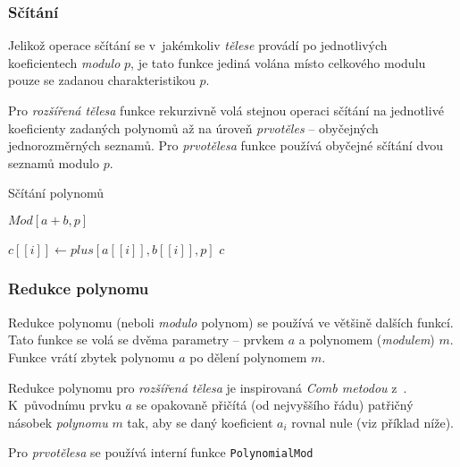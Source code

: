 \documentclass[thesis=M,czech,hidelinks]{FITthesis}[2012/06/26]
\newcommand{\0}{{\textcolor[gray]{0.100}{0}}}
\newenvironment{algoritmus}{
    \floatname{algorithm}{Algoritmus}
    \begin{algorithm}
}{\end{algorithm}}
\begin{document}
\subsubsection{Sčítání}
Jelikož operace sčítání se v~jakémkoliv \emph{tělese} provádí po jednotlivých
koeficientech \emph{modulo} $p$, je tato funkce jediná volána místo celkového
modulu pouze se zadanou charakteristikou $p$.

Pro \emph{rozšířená tělesa} funkce rekurzivně volá stejnou operaci sčítání na
jednotlivé koeficienty zadaných polynomů až na úroveň \emph{prvotěles} --
obyčejných jednorozměrných seznamů. Pro \emph{prvotělesa} funkce používá
obyčejné sčítání dvou seznamů modulo $p$.

\begin{algoritmus}[h!]
    \caption{Sčítání polynomů}
    \begin{algorithmic}[1]
        \State \Return $Mod[a+b,p]$
     \EndFunction
    \end{algorithmic}
    \begin{algorithmic}[1]
            \State $c[[i]] \gets plus[a[[i]],b[[i]],p]$
        \EndFor
        \State \Return $c$
     \EndFunction
    \end{algorithmic}
\end{algoritmus}

\subsubsection{Redukce polynomu}
Redukce polynomu (neboli \emph{modulo} polynom) se používá ve většině dalších
funkcí. Tato funkce se volá se dvěma parametry -- prvkem $a$ a polynomem
(\emph{modulem}) $m$. Funkce vrátí zbytek polynomu $a$ po dělení polynomem $m$.

Redukce polynomu pro \emph{rozšířená tělesa} je inspirovaná \emph{Comb metodou}
z~\cite{Paar_Efficient}. K~původnímu prvku $a$ se opakovaně přičítá (od
nejvyššího řádu) patřičný násobek \emph{polynomu} $m$ tak, aby se daný
koeficient $a_i$ rovnal nule (viz příklad níže).

Pro \emph{prvotělesa} se používá interní funkce \texttt{PolynomialMod}
\end{document}
